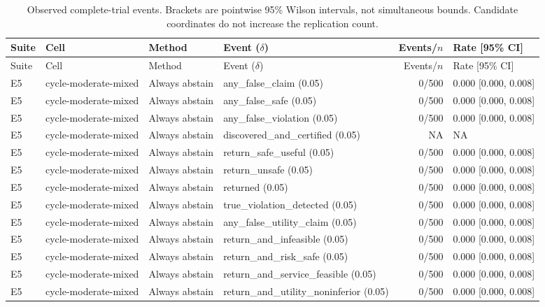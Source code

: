 \begingroup\small\setlength{\tabcolsep}{3pt}
\begin{longtable}{p{.04\linewidth}p{.18\linewidth}p{.19\linewidth}p{.16\linewidth}r p{.21\linewidth}}
\caption{Observed complete-trial events. Brackets are pointwise 95\% Wilson intervals, not simultaneous bounds. Candidate coordinates do not increase the replication count.}\\
\toprule Suite & Cell & Method & Event ($\delta$) & Events/$n$ & Rate [95\% CI]\\\midrule\endfirsthead
\toprule Suite & Cell & Method & Event ($\delta$) & Events/$n$ & Rate [95\% CI]\\\midrule\endhead
E5 & cycle-moderate-mixed & Always abstain & any\_false\_claim (0.05) & 0/500 & 0.000 [0.000, 0.008]\\
E5 & cycle-moderate-mixed & Always abstain & any\_false\_safe (0.05) & 0/500 & 0.000 [0.000, 0.008]\\
E5 & cycle-moderate-mixed & Always abstain & any\_false\_violation (0.05) & 0/500 & 0.000 [0.000, 0.008]\\
E5 & cycle-moderate-mixed & Always abstain & discovered\_and\_certified (0.05) & NA & NA\\
E5 & cycle-moderate-mixed & Always abstain & return\_safe\_useful (0.05) & 0/500 & 0.000 [0.000, 0.008]\\
E5 & cycle-moderate-mixed & Always abstain & return\_unsafe (0.05) & 0/500 & 0.000 [0.000, 0.008]\\
E5 & cycle-moderate-mixed & Always abstain & returned (0.05) & 0/500 & 0.000 [0.000, 0.008]\\
E5 & cycle-moderate-mixed & Always abstain & true\_violation\_detected (0.05) & 0/500 & 0.000 [0.000, 0.008]\\
E5 & cycle-moderate-mixed & Always abstain & any\_false\_utility\_claim (0.05) & 0/500 & 0.000 [0.000, 0.008]\\
E5 & cycle-moderate-mixed & Always abstain & return\_and\_infeasible (0.05) & 0/500 & 0.000 [0.000, 0.008]\\
E5 & cycle-moderate-mixed & Always abstain & return\_and\_risk\_safe (0.05) & 0/500 & 0.000 [0.000, 0.008]\\
E5 & cycle-moderate-mixed & Always abstain & return\_and\_service\_feasible (0.05) & 0/500 & 0.000 [0.000, 0.008]\\
E5 & cycle-moderate-mixed & Always abstain & return\_and\_utility\_noninferior (0.05) & 0/500 & 0.000 [0.000, 0.008]\\

\end{longtable}

